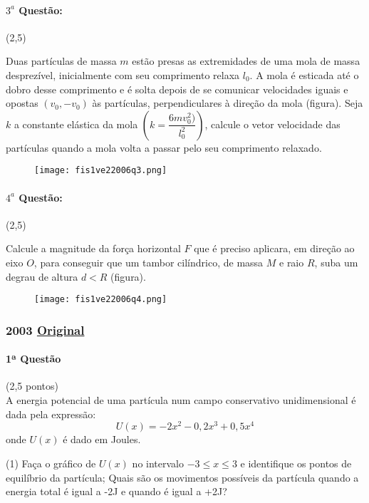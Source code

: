 \documentclass[12pt,a4paper]{article}
\newcommand{\original}[1]{\tiny \href{#1}{Original} \normalsize}
\begin{document}
\paragraph{$3^a$ Questão:} (2,5)

Duas partículas de massa $m$ estão presas as extremidades de uma mola de massa desprezível, inicialmente com seu comprimento
relaxa $l_0$. A mola é esticada até o dobro desse comprimento e é solta depois de se comunicar velocidades iguais e opostas $(v_0,-v_0)$
às partículas, perpendiculares à direção da mola (figura). Seja $k$ a constante elástica da mola $(k=\dfrac{6mv^2_0)}{l^2_0})$,
calcule o vetor velocidade das partículas quando a mola volta a passar pelo seu comprimento relaxado.

\begin{figure}[ht]
\centering
\texttt{[image: fis1ve22006q3.png]}
\end{figure}

\paragraph{$4^a$ Questão:} (2,5)

Calcule a magnitude da força horizontal $F$ que é preciso aplicara, em direção ao eixo $O$, para conseguir que um tambor cilíndrico, de massa $M$
e raio $R$, suba um degrau de altura $d<R$ (figura).

\begin{figure}[ht]
\centering
\texttt{[image: fis1ve22006q4.png]}
\end{figure}

\newpage

\subsubsection{2003 \original{https://drive.google.com/open?id=122rY8tzBP2B_I6_SMNqJgFQrQlNd2R1E}}

\paragraph{1ª Questão} (2,5 pontos)\\
A energia potencial de uma partícula num campo conservativo unidimensional é dada pela expressão:$$U(x) = -2x^2 - 0,2x^3 + 0,5x^4$$onde $U(x)$ é dado em Joules.
\begin{tasks}(1)
\task Faça o gráfico de $U(x)$ no intervalo $-3 \le x \le 3$ e identifique os pontos de equilíbrio da partícula;
\task Quais são os movimentos possíveis da partícula quando a energia total é igual a -2J e quando é igual a +2J?
\end{tasks}
\end{document}
